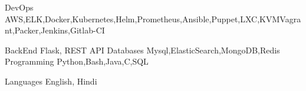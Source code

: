 

\begin{cvskills}

  \cvskill
    {DevOps} %
	{AWS,ELK,Docker,Kubernetes,Helm,Prometheus,Ansible,Puppet,LXC,KVMVagrant,Packer,Jenkins,Gitlab-CI} %

  \cvskill
   {BackEnd} %
	{Flask, REST API} %
  \cvskill
   {Databases} %
	{Mysql,ElasticSearch,MongoDB,Redis} %
  \cvskill
   {Programming} %
	{Python,Bash,Java,C,SQL} %

  \cvskill
    {Languages} %
	{English, Hindi} %

\end{cvskills}
